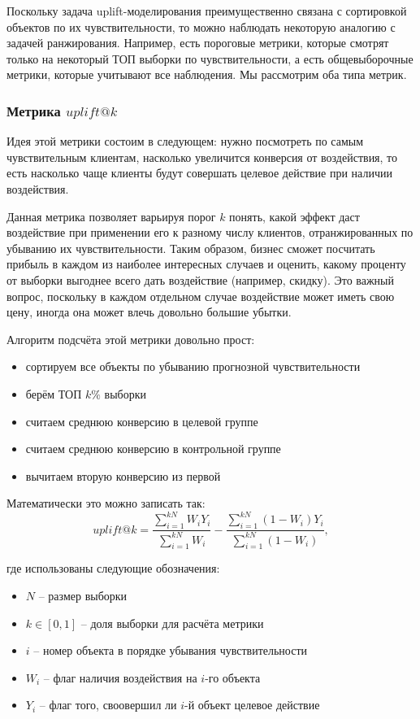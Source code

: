Поскольку задача uplift-моделирования преимущественно связана с сортировкой объектов по их чувствительности, то можно наблюдать некоторую аналогию с задачей ранжирования. Например, есть пороговые метрики, которые смотрят только на некоторый ТОП выборки по чувствительности, а есть общевыборочные метрики, которые учитывают все наблюдения. Мы рассмотрим оба типа метрик.



\subsubsection*{Метрика $uplift@k$}

Идея этой метрики состоим в следующем: нужно посмотреть по самым чувствительным клиентам, насколько увеличится конверсия от воздействия, то есть насколько чаще клиенты будут совершать целевое действие при наличии воздействия.

Данная метрика позволяет варьируя порог $k$ понять, какой эффект даст воздействие при применении его к разному числу клиентов, отранжированных по убыванию их чувствительности. Таким образом, бизнес сможет посчитать прибыль в каждом из наиболее интересных случаев и оценить, какому проценту от выборки выгоднее всего дать воздействие (например, скидку). Это важный вопрос, поскольку в каждом отдельном случае воздействие может иметь свою цену, иногда она может влечь довольно большие убытки.

Алгоритм подсчёта этой метрики довольно прост:
\begin{itemize}
    \item сортируем все объекты по убыванию прогнозной чувствительности
    \item берём ТОП $k\%$ выборки
    \item считаем среднюю конверсию в целевой группе 
    \item считаем среднюю конверсию в контрольной группе
    \item вычитаем вторую конверсию из первой
\end{itemize}

Математически это можно записать так:
$$
    uplift@k =
        \frac{
            \sum\limits_{i=1}^{kN} W_i Y_i
        }{
            \sum\limits_{i=1}^{kN} W_i
        }
        -
        \frac{
            \sum\limits_{i=1}^{kN} (1 - W_i) Y_i
        }{
            \sum\limits_{i=1}^{kN} (1 - W_i)
        }
    ,
$$

где использованы следующие обозначения:
\begin{itemize}
    \item $N$ -- размер выборки
    \item $k \in [ 0, 1 ]$ -- доля выборки для расчёта метрики
    \item $i$ -- номер объекта в порядке убывания чувствительности
    \item $W_i$ -- флаг наличия воздействия на $i$-го объекта
    \item $Y_i$ -- флаг того, своовершил ли $i$-й объект целевое действие
\end{itemize}

